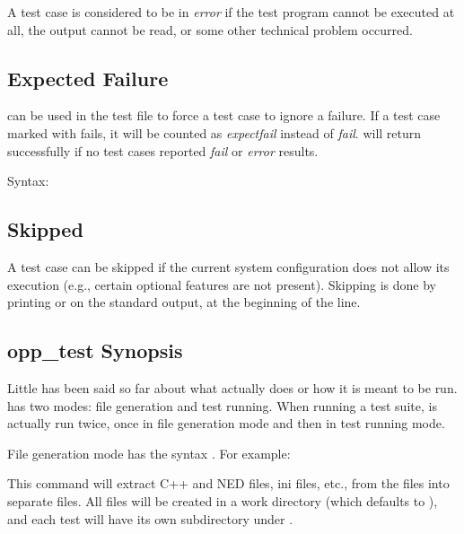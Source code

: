 A test case is considered to be in \textit{error} if the test program cannot be executed
at all, the output cannot be read, or some other technical problem occurred.

\subsection{Expected Failure}
\label{sec:testing:opptest:expected-failure}

 can be used in the test file to force a test case
to ignore a failure. If a test case marked with  fails,
it will be counted as \textit{expectfail} instead of \textit{fail}.
 will return successfully if no test cases reported \textit{fail}
or \textit{error} results.

Syntax:
\begin{filelisting}
\end{filelisting}

\subsection{Skipped}
\label{sec:testing:opptest:skipped}

A test case can be skipped if the current system configuration does not allow
its execution (e.g., certain optional features are not present). Skipping is done
by printing  or  on the
standard output, at the beginning of the line.

\subsection{opp\_test Synopsis}
\label{sec:testing:opptest:synopsys}

Little has been said so far about what  actually does or how it
is meant to be run.  has two modes: file generation and
test running. When running a test suite,  is actually run
twice, once in file generation mode and then in test running mode.

File generation mode has the syntax . For example:


This command will extract C++ and NED files, ini files, etc., from
the  files into separate files. All files will be created
in a work directory (which defaults to ),
and each test will have its own subdirectory under .


